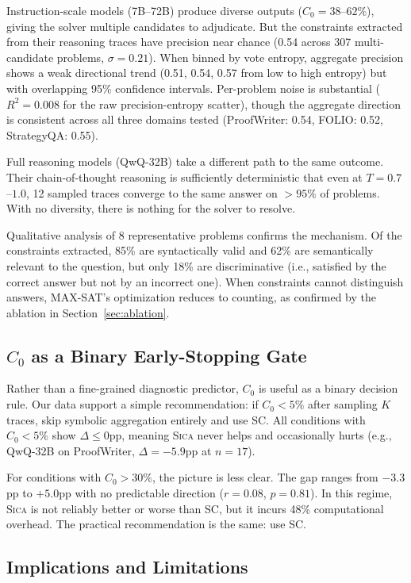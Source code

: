 \documentclass[11pt,a4paper]{article}
\newcommand{\sica}{\textsc{Sica}}
\newcommand{\czero}{C_0}
\begin{document}
Instruction-scale models (7B--72B) produce diverse outputs ($\czero = 38$--$62\%$), giving the solver multiple candidates to adjudicate. But the constraints extracted from their reasoning traces have precision near chance (0.54 across 307 multi-candidate problems, $\sigma = 0.21$). When binned by vote entropy, aggregate precision shows a weak directional trend (0.51, 0.54, 0.57 from low to high entropy) but with overlapping 95\% confidence intervals. Per-problem noise is substantial ($R^2 = 0.008$ for the raw precision-entropy scatter), though the aggregate direction is consistent across all three domains tested (ProofWriter: 0.54, FOLIO: 0.52, StrategyQA: 0.55).

Full reasoning models (QwQ-32B) take a different path to the same outcome. Their chain-of-thought reasoning is sufficiently deterministic that even at $T = 0.7$--$1.0$, 12 sampled traces converge to the same answer on $> 95\%$ of problems. With no diversity, there is nothing for the solver to resolve.

Qualitative analysis of 8 representative problems confirms the mechanism. Of the constraints extracted, 85\% are syntactically valid and 62\% are semantically relevant to the question, but only 18\% are discriminative (i.e., satisfied by the correct answer but not by an incorrect one). When constraints cannot distinguish answers, MAX-SAT's optimization reduces to counting, as confirmed by the ablation in Section~\ref{sec:ablation}.

\subsection{$\czero$ as a Binary Early-Stopping Gate}

Rather than a fine-grained diagnostic predictor, $\czero$ is useful as a binary decision rule. Our data support a simple recommendation: if $\czero < 5\%$ after sampling $K$ traces, skip symbolic aggregation entirely and use SC. All conditions with $\czero < 5\%$ show $\Delta \leq 0$pp, meaning \sica{} never helps and occasionally hurts (e.g., QwQ-32B on ProofWriter, $\Delta = -5.9$pp at $n = 17$).

For conditions with $\czero > 30\%$, the picture is less clear. The gap ranges from $-3.3$pp to $+5.0$pp with no predictable direction ($r = 0.08$, $p = 0.81$). In this regime, \sica{} is not reliably better or worse than SC, but it incurs 48\% computational overhead. The practical recommendation is the same: use SC.

\subsection{Implications and Limitations}
\end{document}
